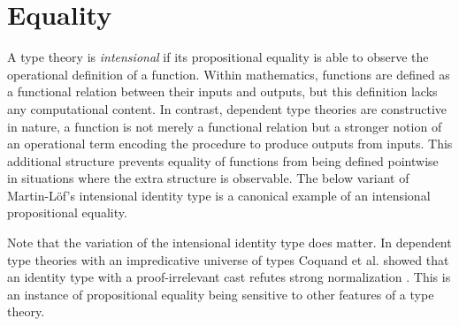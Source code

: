 \section{Equality}

A type theory is \textit{intensional} if its propositional equality is able to observe the operational definition of a function.
Within mathematics, functions are defined as a functional relation between their inputs and outputs, but this definition lacks any computational content.
In contrast, dependent type theories are constructive in nature, a function is not merely a functional relation but a stronger notion of an operational term encoding the procedure to produce outputs from inputs.
This additional structure prevents equality of functions from being defined pointwise in situations where the extra structure is observable.
The below variant of Martin-L\"{o}f's intensional identity type is a canonical example of an intensional propositional equality.


Note that the variation of the intensional identity type does matter.
In dependent type theories with an impredicative universe of types Coquand et al. showed that an identity type with a proof-irrelevant cast refutes strong normalization \cite{abel2020_normalization}.
This is an instance of propositional equality being sensitive to other features of a type theory.

